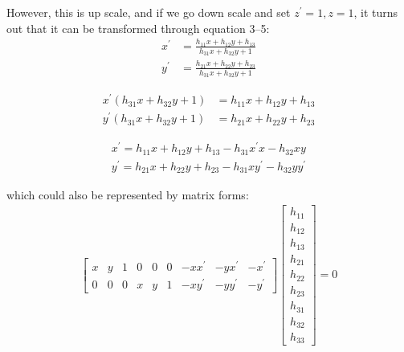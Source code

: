 \documentclass[conference]{IEEEtran}
\begin{document}
However, this is up scale, and if we go down scale and set $z^\prime = 1, z = 1$, it turns out that it can be transformed through equation 3--5:
\begin{equation}
	\begin{split}
		x^\prime &=\frac{ h_{11}x + h_{12}y + h_{13}}{h_{31}x + h_{32}y + 1}\\
		y^\prime &= \frac{h_{21}x + h_{22}y + h_{23}}{h_{31}x + h_{32}y + 1}
	\end{split}
\end{equation}

\begin{equation}
	\begin{split}
		x^\prime (h_{31}x + h_{32}y + 1) &= h_{11}x + h_{12}y + h_{13}\\
		y^\prime (h_{31}x + h_{32}y + 1)&= h_{21}x + h_{22}y + h_{23}
	\end{split}
\end{equation}

\begin{equation}
	\begin{split}
		x^\prime = h_{11}x + h_{12}y + h_{13} - h_{31}x^\prime x - h_{32}xy\\
		y^\prime = h_{21}x + h_{22}y + h_{23} - h_{31}xy^\prime - h_{32}yy^\prime
	\end{split}
\end{equation}

\noindent which could also be represented by matrix forms:
\begin{equation}
	\begin{split}
		\begin{bmatrix}
			x & y & 1 & 0 & 0 & 0 & -xx^\prime & -yx^\prime & -x^\prime \\
			0 & 0 & 0 & x & y & 1 & -xy^\prime & -yy^\prime & -y^\prime
		\end{bmatrix}
		\begin{bmatrix}
			h_{11} \\
			h_{12} \\
			h_{13} \\
			h_{21} \\
			h_{22} \\
			h_{23} \\
			h_{31} \\
			h_{32} \\
			h_{33}
		\end{bmatrix} = 0
	\end{split}
\end{equation}
\end{document}

